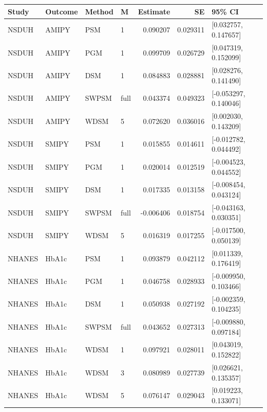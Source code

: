 \begin{tabular}{llllrrl}
\hline
Study & Outcome & Method & M & Estimate & SE & 95\% CI \\
\hline
NSDUH & AMIPY & PSM & 1 & 0.090207 & 0.029311 & [0.032757, 0.147657] \\
NSDUH & AMIPY & PGM & 1 & 0.099709 & 0.026729 & [0.047319, 0.152099] \\
NSDUH & AMIPY & DSM & 1 & 0.084883 & 0.028881 & [0.028276, 0.141490] \\
NSDUH & AMIPY & SWPSM & full & 0.043374 & 0.049323 & [-0.053297, 0.140046] \\
NSDUH & AMIPY & WDSM & 5 & 0.072620 & 0.036016 & [0.002030, 0.143209] \\
NSDUH & SMIPY & PSM & 1 & 0.015855 & 0.014611 & [-0.012782, 0.044492] \\
NSDUH & SMIPY & PGM & 1 & 0.020014 & 0.012519 & [-0.004523, 0.044552] \\
NSDUH & SMIPY & DSM & 1 & 0.017335 & 0.013158 & [-0.008454, 0.043124] \\
NSDUH & SMIPY & SWPSM & full & -0.006406 & 0.018754 & [-0.043163, 0.030351] \\
NSDUH & SMIPY & WDSM & 5 & 0.016319 & 0.017255 & [-0.017500, 0.050139] \\
NHANES & HbA1c & PSM & 1 & 0.093879 & 0.042112 & [0.011339, 0.176419] \\
NHANES & HbA1c & PGM & 1 & 0.046758 & 0.028933 & [-0.009950, 0.103466] \\
NHANES & HbA1c & DSM & 1 & 0.050938 & 0.027192 & [-0.002359, 0.104235] \\
NHANES & HbA1c & SWPSM & full & 0.043652 & 0.027313 & [-0.009880, 0.097184] \\
NHANES & HbA1c & WDSM & 1 & 0.097921 & 0.028011 & [0.043019, 0.152822] \\
NHANES & HbA1c & WDSM & 3 & 0.080989 & 0.027739 & [0.026621, 0.135357] \\
NHANES & HbA1c & WDSM & 5 & 0.076147 & 0.029043 & [0.019223, 0.133071] \\
\hline
\end{tabular}
